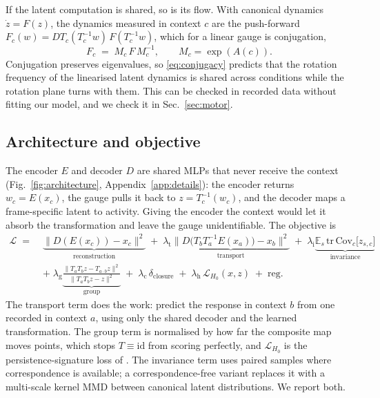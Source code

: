 \documentclass{article}
\theoremstyle{plain}
\begin{document}
If the latent computation is shared, so is its flow. With canonical dynamics
$\dot z = F(z)$, the dynamics measured in context $c$ are the push-forward
$F_c(w) = DT_c(T_c^{-1}w)\, F(T_c^{-1}w)$, which for a linear gauge is
conjugation,
\begin{equation}
  F_c \;=\; M_c\, F\, M_c^{-1}, \qquad M_c = \exp(A(c)).
  \label{eq:conjugacy}
\end{equation}
Conjugation preserves eigenvalues, so \eqref{eq:conjugacy} predicts that the
rotation frequency of the linearised latent dynamics is shared across conditions
while the rotation plane turns with them. This can be checked in recorded data
without fitting our model, and we check it in Sec.~\ref{sec:motor}.

\subsection{Architecture and objective}

The encoder $E$ and decoder $D$ are shared MLPs that never receive the context
(Fig.~\ref{fig:architecture}, Appendix~\ref{app:details}): the encoder returns
$w_c = E(x_c)$, the gauge pulls it back to $z = T_c^{-1}(w_c)$, and the decoder
maps a frame-specific latent to activity. Giving the encoder the context would
let it absorb the transformation and leave the gauge unidentifiable. The
objective is
\begin{align}
  \mathcal{L} \;=\;
  &\underbrace{\big\|D(E(x_c)) - x_c\big\|^2}_{\text{reconstruction}}
  \;+\; \lambda_{\mathrm{t}}
  \underbrace{\big\|D\big(T_b T_a^{-1} E(x_a)\big) - x_b\big\|^2}_{\text{transport}}
  \;+\; \lambda_{\mathrm{i}}
  \underbrace{\mathbb{E}_s\,\mathrm{tr}\,\mathrm{Cov}_c\big[z_{s,c}\big]}_{\text{invariance}}
  \nonumber\\[-1pt]
  &+\; \lambda_{\mathrm{g}}
  \underbrace{\frac{\big\|T_a T_b z - T_{a\cdot b} z\big\|^2}
                   {\big\|T_a T_b z - z\big\|^2}}_{\text{group}}
  \;+\; \lambda_{\mathrm{c}}\, \delta_{\mathrm{closure}}
  \;+\; \lambda_{\mathrm{h}}\, \mathcal{L}_{H_0}(x,z)
  \;+\; \text{reg.}
  \label{eq:loss}
\end{align}
The transport term does the work: predict the response in context $b$ from one
recorded in context $a$, using only the shared decoder and the learned
transformation. The group term is normalised by how far the composite map moves
points, which stops $T \equiv \mathrm{id}$ from scoring perfectly, and
$\mathcal{L}_{H_0}$ is the persistence-signature loss of
\citet{moor2020topological}. The invariance term uses paired samples where
correspondence is available; a correspondence-free variant replaces it with a
multi-scale kernel MMD \citep{gretton2012kernel} between canonical latent
distributions. We report both.
\end{document}
